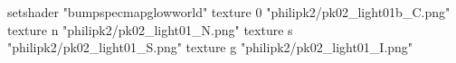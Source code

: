 setshader "bumpspecmapglowworld"
    texture 0 "philipk2/pk02_light01b_C.png"
    texture n "philipk2/pk02_light01_N.png"
    texture s "philipk2/pk02_light01_S.png"
    texture g "philipk2/pk02_light01_I.png"